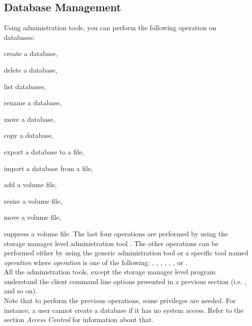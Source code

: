 \subsection{Database Management}
Using \eyedb administration tools, you can perform the following operation
on databases:
\be
\item create a database,
\item delete a database,
\item list databases,
\item rename a database,
\item move a database,
\item copy a database,
\item export a database to a file,
\item import a database from a file,
\item add a volume file,
\item resize a volume file,
\item move a volume file,
\item suppress a volume file.
\ee
The last four operations are performed by using the storage manager level
administration tool . The other operations can be
performed either by using the  generic administration tool
or a specific tool named \emph{operation} where
\emph{operation} is one of the following: , ,
, , , ,  or .
\\
All the administration tools, except the storage manager level
 program understand the client command line options presented
in a previous section (i.e. ,  and so on).
\\
Note that to perform the previous operations, some privileges are needed.
For instance, a user cannot create a database if it has no 
system access. Refer to the section \emph{Access Control} for information
about that.
